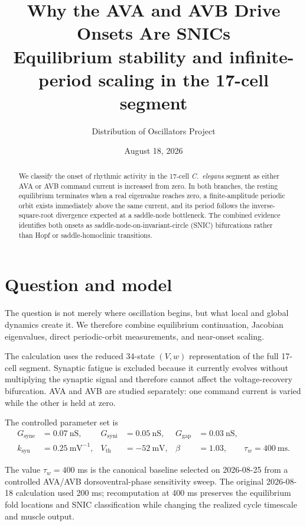 \documentclass[11pt]{article}
\title{Why the AVA and AVB Drive Onsets Are SNICs\\
\large Equilibrium stability and infinite-period scaling in the 17-cell segment}
\author{Distribution of Oscillators Project}
\date{August 18, 2026}
\begin{document}
\maketitle

\begin{abstract}
We classify the onset of rhythmic activity in the 17-cell \textit{C.~elegans}
segment as either AVA or AVB command current is increased from zero. In both
branches, the resting equilibrium terminates when a real eigenvalue reaches
zero, a finite-amplitude periodic orbit exists immediately above the same
current, and its period follows the inverse-square-root divergence expected at
a saddle-node bottleneck. The combined evidence identifies both onsets as
saddle-node-on-invariant-circle (SNIC) bifurcations rather than Hopf or
saddle-homoclinic transitions.
\end{abstract}

\section{Question and model}

The question is not merely where oscillation begins, but what local and global
dynamics create it. We therefore combine equilibrium continuation, Jacobian
eigenvalues, direct periodic-orbit measurements, and near-onset scaling.

The calculation uses the reduced 34-state $(V,w)$ representation of the full
17-cell segment. Synaptic fatigue is excluded because it currently evolves
without multiplying the synaptic signal and therefore cannot affect the
voltage-recovery bifurcation. AVA and AVB are studied separately: one command
current is varied while the other is held at zero.

The controlled parameter set is
\begin{align*}
G_{\mathrm{syne}} &= 0.07\ \mathrm{nS}, &
G_{\mathrm{syni}} &= 0.05\ \mathrm{nS}, &
G_{\mathrm{gap}} &= 0.03\ \mathrm{nS}, \\
k_{\mathrm{syn}} &= 0.25\ \mathrm{mV}^{-1}, &
V_{\mathrm{th}} &= -52\ \mathrm{mV}, &
\beta &= 1.03, \qquad \tau_w=400\ \mathrm{ms}.
\end{align*}

The value $\tau_w=400$ ms is the canonical baseline selected on
2026-08-25 from a controlled AVA/AVB dorsoventral-phase sensitivity sweep.
The original 2026-08-18 calculation used 200 ms; recomputation at 400 ms
preserves the equilibrium fold locations and SNIC classification while
changing the realized cycle timescale and muscle output.
\end{document}

